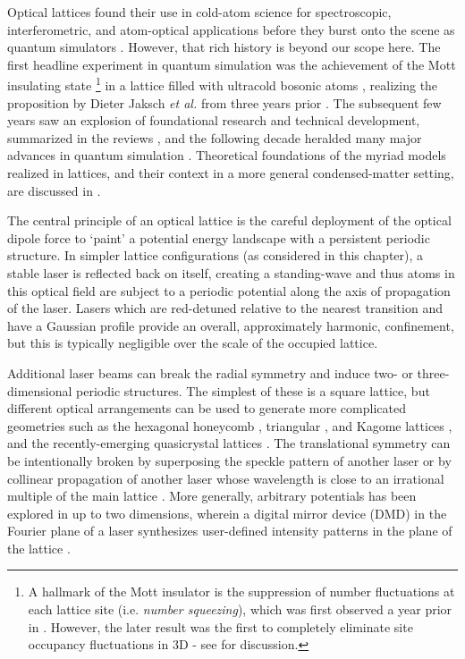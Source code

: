 	Optical lattices found their use in cold-atom science for spectroscopic, interferometric, and atom-optical applications before they burst onto the scene as quantum simulators \cite{papers}.
	However, that rich history is beyond our scope here.
	The first headline experiment in quantum simulation was the achievement of the Mott insulating state \cite{Greiner01}\footnote{A hallmark of the Mott insulator is the suppression of number fluctuations at each lattice site (i.e.
	\emph{number squeezing}), which was first observed a year prior in \cite{Orzel01}.
	However, the later result was the first to completely eliminate site occupancy fluctuations in 3D - see \cite{Morsch06} for discussion.} in a lattice filled with ultracold bosonic atoms \cite{Greiner02}, realizing the proposition by Dieter Jaksch \emph{et al.} from three years prior \cite{Jaksch98}.
	The subsequent few years saw an explosion of foundational research and technical development, summarized in the reviews \cite{Morsch06,Bloch08}, and the following decade heralded many major advances in quantum simulation \cite{Bloch12,Gross17}.
	Theoretical foundations of the myriad models realized in lattices, and their context in a more general condensed-matter setting, are discussed in \cite{LewensteinLattices, Lewenstein07}.

	The central principle of an optical lattice is the careful deployment of the optical dipole force \cite{Grimm00} to `paint' a potential energy landscape with a persistent periodic structure.
	In simpler lattice configurations (as considered in this chapter), a stable laser is reflected back on itself, creating a standing-wave and thus atoms in this optical field are subject to a periodic potential along the axis of propagation of the laser.
	Lasers which are red-detuned relative to the nearest transition and have a Gaussian profile provide an overall, approximately harmonic, confinement, but this is typically negligible over the scale of the occupied lattice.
	
	Additional laser beams can break the radial symmetry and induce two- or three-dimensional periodic structures.
	The simplest of these is a square lattice, but different optical arrangements can be used to generate more complicated geometries such as the hexagonal honeycomb \cite{Jotzu14},  triangular \cite{paper}, and Kagome lattices \cite{}, and the recently-emerging quasicrystal lattices \cite{}.
	The translational symmetry can be intentionally broken by superposing the speckle pattern of another laser \cite{Schneider, others} or by collinear propagation of another laser whose wavelength is close to an irrational multiple of the main lattice \cite{egs}.
	More generally, arbitrary potentials has been explored in up to two dimensions, wherein a digital mirror device (DMD) in the Fourier plane of a laser synthesizes user-defined intensity patterns in the plane of the lattice \cite{}.
	
